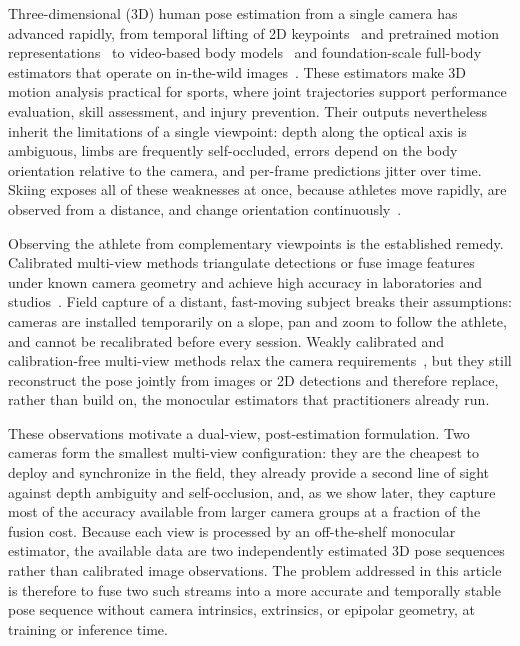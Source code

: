 \documentclass[preprint,12pt]{elsarticle}
\begin{document}
Three-dimensional (3D) human pose estimation from a single camera has advanced rapidly, from temporal lifting of 2D keypoints~\cite{pavllo2019videopose3d,zheng2021poseformer,li2022mhformer} and pretrained motion representations~\cite{zhu2023motionbert} to video-based body models~\cite{kocabas2020vibe} and foundation-scale full-body estimators that operate on in-the-wild images~\cite{yang2026sam}. These estimators make 3D motion analysis practical for sports, where joint trajectories support performance evaluation, skill assessment, and injury prevention. Their outputs nevertheless inherit the limitations of a single viewpoint: depth along the optical axis is ambiguous, limbs are frequently self-occluded, errors depend on the body orientation relative to the camera, and per-frame predictions jitter over time. Skiing exposes all of these weaknesses at once, because athletes move rapidly, are observed from a distance, and change orientation continuously~\cite{rhodin2018learning,chen2021sportscap}.

Observing the athlete from complementary viewpoints is the established remedy. Calibrated multi-view methods triangulate detections or fuse image features under known camera geometry and achieve high accuracy in laboratories and studios~\cite{nogueira2025survey,iskakov2019learnable,he2020epipolar,liao2024multiple,zhang2021adafuse}. Field capture of a distant, fast-moving subject breaks their assumptions: cameras are installed temporarily on a slope, pan and zoom to follow the athlete, and cannot be recalibrated before every session. Weakly calibrated and calibration-free multi-view methods relax the camera requirements~\cite{usman2022metapose,gordon2022flex}, but they still reconstruct the pose jointly from images or 2D detections and therefore replace, rather than build on, the monocular estimators that practitioners already run.

These observations motivate a dual-view, post-estimation formulation. Two cameras form the smallest multi-view configuration: they are the cheapest to deploy and synchronize in the field, they already provide a second line of sight against depth ambiguity and self-occlusion, and, as we show later, they capture most of the accuracy available from larger camera groups at a fraction of the fusion cost. Because each view is processed by an off-the-shelf monocular estimator, the available data are two independently estimated 3D pose sequences rather than calibrated image observations. The problem addressed in this article is therefore to fuse two such streams into a more accurate and temporally stable pose sequence without camera intrinsics, extrinsics, or epipolar geometry, at training or inference time.
\end{document}

